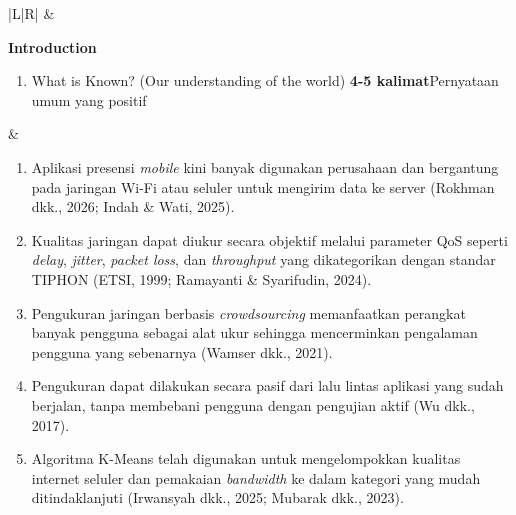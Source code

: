 \documentclass[11pt,a4paper]{article}
\newcommand{\kepala}{\multicolumn{1}{|c|}{\textbf{Component}} & \multicolumn{1}{c|}{\textbf{Content}}\\ \hline}
\begin{document}
\vspace{6pt}
\begin{longtable}{|L|R|}
\hline
\kepala
\endhead

\textbf{Introduction}
\begin{enumerate}[label=\arabic*.]
\item What is Known? (Our understanding of the world) \textbf{4-5 kalimat}\newline Pernyataan umum yang positif
\end{enumerate}
&
\begin{enumerate}[label=\arabic*.]
\item Aplikasi presensi \textit{mobile} kini banyak digunakan perusahaan dan bergantung pada jaringan Wi-Fi atau seluler untuk mengirim data ke server (Rokhman dkk., 2026; Indah \& Wati, 2025).
\item Kualitas jaringan dapat diukur secara objektif melalui parameter QoS seperti \textit{delay}, \textit{jitter}, \textit{packet loss}, dan \textit{throughput} yang dikategorikan dengan standar TIPHON (ETSI, 1999; Ramayanti \& Syarifudin, 2024).
\item Pengukuran jaringan berbasis \textit{crowdsourcing} memanfaatkan perangkat banyak pengguna sebagai alat ukur sehingga mencerminkan pengalaman pengguna yang sebenarnya (Wamser dkk., 2021).
\item Pengukuran dapat dilakukan secara pasif dari lalu lintas aplikasi yang sudah berjalan, tanpa membebani pengguna dengan pengujian aktif (Wu dkk., 2017).
\item Algoritma K-Means telah digunakan untuk mengelompokkan kualitas internet seluler dan pemakaian \textit{bandwidth} ke dalam kategori yang mudah ditindaklanjuti (Irwansyah dkk., 2025; Mubarak dkk., 2023).
\end{enumerate}
\\ \hline


\end{longtable}
\end{document}
